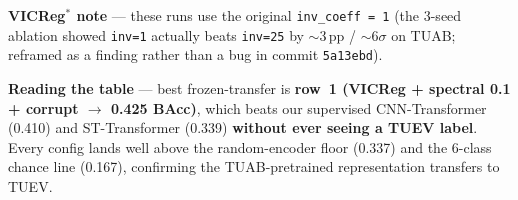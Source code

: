 \documentclass[10pt,a4paper]{article}
\begin{document}
\noindent\textbf{VICReg$^{*}$ note} --- these runs use the original \texttt{inv\_coeff = 1} (the
3-seed ablation showed \texttt{inv=1} actually beats \texttt{inv=25} by $\sim$3\,pp / $\sim$6$\sigma$
on TUAB; reframed as a finding rather than a bug in commit \texttt{5a13ebd}).

\medskip

\noindent\textbf{Reading the table} --- best frozen-transfer is \textbf{row~1 (VICReg + spectral
0.1 + corrupt $\to$ 0.425 BAcc)}, which beats our supervised CNN-Transformer (0.410) and
ST-Transformer (0.339) \textbf{without ever seeing a TUEV label}. Every config lands well above
the random-encoder floor (0.337) and the 6-class chance line (0.167), confirming the
TUAB-pretrained representation transfers to TUEV.
\end{document}
